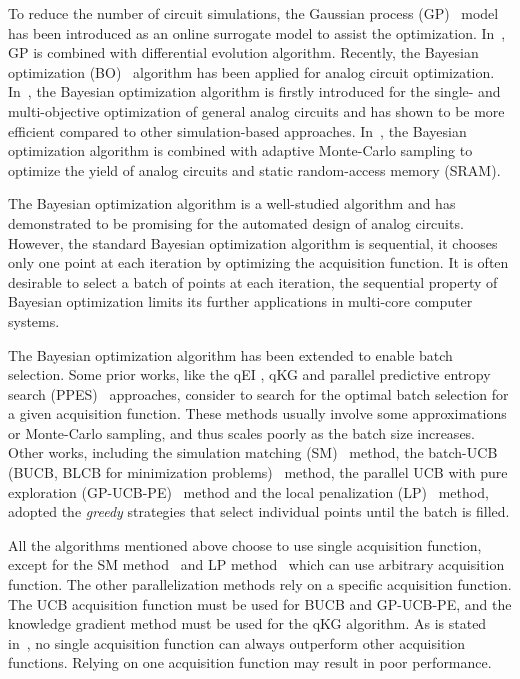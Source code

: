 %
To reduce the number of circuit simulations, the Gaussian process
(GP)~\cite{GPML} model has been introduced as an online surrogate model to
assist the optimization. In~\cite{liu2014gaspad}, GP is combined with
differential evolution algorithm. Recently, the
Bayesian optimization (BO)~\cite{shahriari2016taking} algorithm has been
applied for analog circuit optimization. In~\cite{lyu2017efficient}, the Bayesian optimization algorithm is
firstly introduced for the single- and multi-objective optimization of general analog circuits and has
shown to be more efficient compared to other simulation-based
approaches. In~\cite{wang2017efficient}, the Bayesian optimization algorithm
is combined with adaptive Monte-Carlo sampling to optimize the yield of analog
circuits and static random-access memory (SRAM).

The Bayesian optimization algorithm is a well-studied algorithm and has
demonstrated to be promising for the automated design of analog circuits.
However, the standard Bayesian optimization algorithm is sequential, it chooses
only one point at each iteration by optimizing the acquisition function. It is
often desirable to select a batch of points at each iteration, the sequential
property of Bayesian optimization limits its further applications in multi-core computer systems.

The Bayesian optimization algorithm has been extended to enable batch
selection. Some prior works, like the qEI \cite{qEI}, qKG \cite{wu2016parallel}
and parallel predictive entropy search (PPES)~\cite{shah2015parallel}
approaches, consider to search for the optimal batch selection for a given
acquisition function. These methods usually involve some approximations or
Monte-Carlo sampling, and thus scales poorly as the batch size increases. Other
works, including the simulation matching (SM)~\cite{azimi2010batch} method, the
batch-UCB (BUCB, BLCB for minimization
problems)~\cite{desautels2014parallelizing} method, the parallel UCB with pure
exploration (GP-UCB-PE)~\cite{contal2013parallel} method and the local
penalization (LP)~\cite{gonzalez2016batch} method, adopted the \emph{greedy}
strategies that select individual points until the batch is filled.

All the algorithms mentioned above choose to use single acquisition function,
except for the SM method~\cite{azimi2010batch} and LP method~\cite{gonzalez2016batch} which can use arbitrary acquisition
function. The other parallelization methods rely on a specific acquisition
function. The UCB acquisition function must be used for BUCB and GP-UCB-PE, and
the knowledge gradient method must be used for the qKG algorithm. As is stated
in~\cite{hoffman2011portfolio}, no single acquisition function can always
outperform other acquisition functions. Relying on one acquisition function may
result in poor performance.

